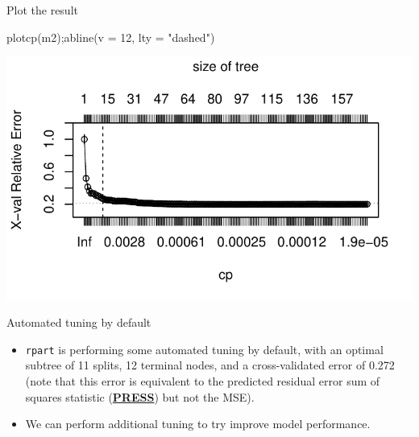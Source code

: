 \documentclass[
  10pt,
  ignorenonframetext,
]{beamer}
\newenvironment{Shaded}{}{}
\newcommand{\DataTypeTok}[1]{#1}
\newcommand{\DecValTok}[1]{#1}
\newcommand{\KeywordTok}[1]{\textcolor[rgb]{0.00,0.00,1.00}{#1}}
\newcommand{\NormalTok}[1]{#1}
\newcommand{\StringTok}[1]{\textcolor[rgb]{0.00,0.50,0.50}{#1}}
\providecommand{\tightlist}{%
  \setlength{\itemsep}{0pt}\setlength{\parskip}{0pt}}
\begin{document}
\begin{frame}[fragile]{Plot the result}
\protect\hypertarget{plot-the-result}{}

\begin{Shaded}
\begin{Highlighting}[]
\KeywordTok{plotcp}\NormalTok{(m2);}\KeywordTok{abline}\NormalTok{(}\DataTypeTok{v =} \DecValTok{12}\NormalTok{, }\DataTypeTok{lty =} \StringTok{"dashed"}\NormalTok{)}
\end{Highlighting}
\end{Shaded}

\includegraphics{c1_trees_bagging_files/figure-beamer/unnamed-chunk-12-1.pdf}

\end{frame}

\begin{frame}[fragile]{Automated tuning by default}
\protect\hypertarget{automated-tuning-by-default}{}

\begin{itemize}
\tightlist
\item
  \texttt{rpart} is performing some automated tuning by default, with an
  optimal subtree of 11 splits, 12 terminal nodes, and a cross-validated
  error of 0.272 (note that this error is equivalent to the predicted
  residual error sum of squares statistic
  (\href{https://en.wikipedia.org/wiki/PRESS_statistic}{\textbf{PRESS}})
  but not the MSE).
\item
  We can perform additional tuning to try improve model performance.
\end{itemize}

\end{frame}
\end{document}
